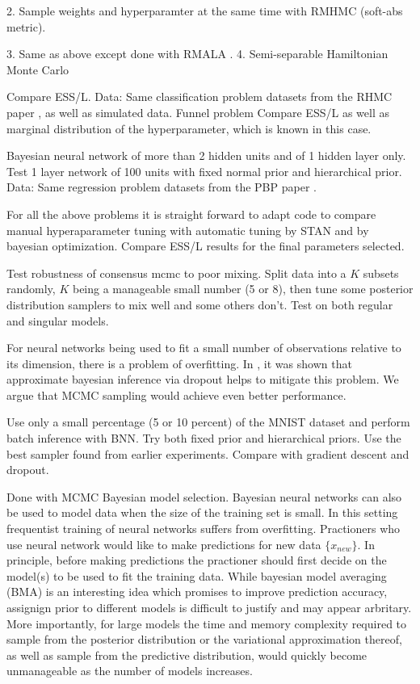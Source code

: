 \documentclass{book}
\begin{document}
\begin{enumerate}
2. Sample weights and hyperparamter at the same time with RMHMC  (soft-abs metric).

3. Same as above except done with RMALA .
4. Semi-separable Hamiltonian Monte Carlo

Compare ESS/L.
Data: Same classification problem datasets from the RHMC paper \cite{girolami2011riemann}, as well as simulated data.
Funnel problem
Compare ESS/L as well as marginal distribution of the hyperparameter, which is known in this case. 

Bayesian neural network of more than 2 hidden units and of 1 hidden layer only. Test 1 layer network of 100 units with fixed normal prior and hierarchical prior.
Data: Same regression problem datasets from the PBP paper \cite{hernandez2015probabilistic}. 


For all the above problems it is straight forward to adapt code to compare manual hyperaparameter tuning with automatic tuning by STAN and by bayesian optimization. Compare ESS/L results for the final parameters selected. 

Test robustness of consensus mcmc to poor mixing. Split data into a $K$ subsets randomly, $K$ being a manageable small number (5 or 8), then tune some posterior distribution samplers to mix well and some others don't. Test on both regular and singular models.
 
For neural networks being used to fit a small number of observations relative to its dimension, there is a problem of overfitting. In \cite{gal2015bayesian}, it was shown that approximate bayesian inference via dropout helps to mitigate this problem. We argue that MCMC sampling would achieve even better performance.

Use only a small percentage (5 or 10 percent) of the MNIST dataset and perform batch inference with BNN. Try both fixed prior and hierarchical priors. Use the best sampler found from earlier experiments. 
Compare with gradient descent and dropout. 

Done with MCMC
Bayesian model selection. 
Bayesian neural networks can also be used to model data when the size of the training set is small. In this setting frequentist training of neural networks suffers from overfitting. Practioners who use neural network would like to make predictions for new data $\{x_{new}\}$. In principle, before making predictions the practioner should first decide on the model(s) to be used to fit the training data. While bayesian model averaging (BMA) is an interesting idea which promises to improve prediction accuracy, assignign prior to different models is difficult to justify and may appear arbritary. More importantly, for large models the time and memory complexity required to sample from the posterior distribution or the variational approximation thereof, as well as sample from the predictive distribution, would quickly become unmanageable as the number of models increases. 


\end{enumerate}
\end{document}
